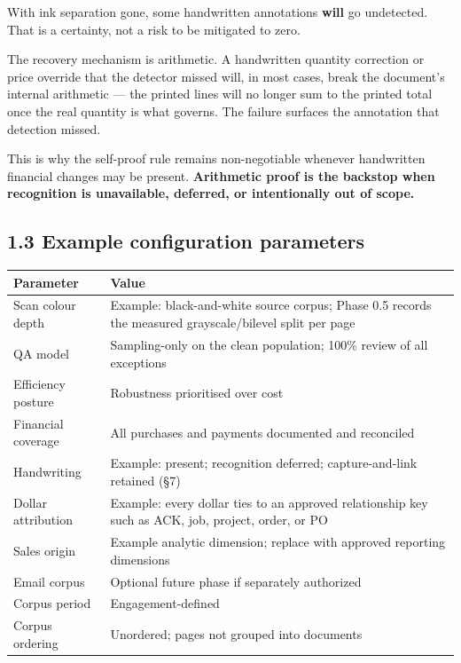 \documentclass[
]{article}
\newcounter{none} %
\begin{document}
With ink separation gone, some handwritten annotations \textbf{will} go
undetected. That is a certainty, not a risk to be mitigated to zero.

The recovery mechanism is arithmetic. A handwritten quantity correction
or price override that the detector missed will, in most cases, break
the document's internal arithmetic --- the printed lines will no longer
sum to the printed total once the real quantity is what governs. The
failure surfaces the annotation that detection missed.

This is why the self-proof rule remains non-negotiable whenever
handwritten financial changes may be present. \textbf{Arithmetic proof
is the backstop when recognition is unavailable, deferred, or
intentionally out of scope.}

\subsection{1.3 Example configuration
parameters}\label{example-configuration-parameters}

{\def\LTcaptype{none} %
\begin{longtable}[]{@{}
  >{\raggedright\arraybackslash}p{}
  >{\raggedright\arraybackslash}p{}@{}}
\toprule\noalign{}
\begin{minipage}[b]{\linewidth}\raggedright
Parameter
\end{minipage} & \begin{minipage}[b]{\linewidth}\raggedright
Value
\end{minipage} \\
\midrule\noalign{}
\endhead
\bottomrule\noalign{}
\endlastfoot
Scan colour depth & Example: black-and-white source corpus; Phase 0.5
records the measured grayscale/bilevel split per page \\
QA model & Sampling-only on the clean population; 100\% review of all
exceptions \\
Efficiency posture & Robustness prioritised over cost \\
Financial coverage & All purchases and payments documented and
reconciled \\
Handwriting & Example: present; recognition deferred; capture-and-link
retained (§7) \\
Dollar attribution & Example: every dollar ties to an approved
relationship key such as ACK, job, project, order, or PO \\
Sales origin & Example analytic dimension; replace with approved
reporting dimensions \\
Email corpus & Optional future phase if separately authorized \\
Corpus period & Engagement-defined \\
Corpus ordering & Unordered; pages not grouped into documents \\
\end{longtable}
}
\end{document}
